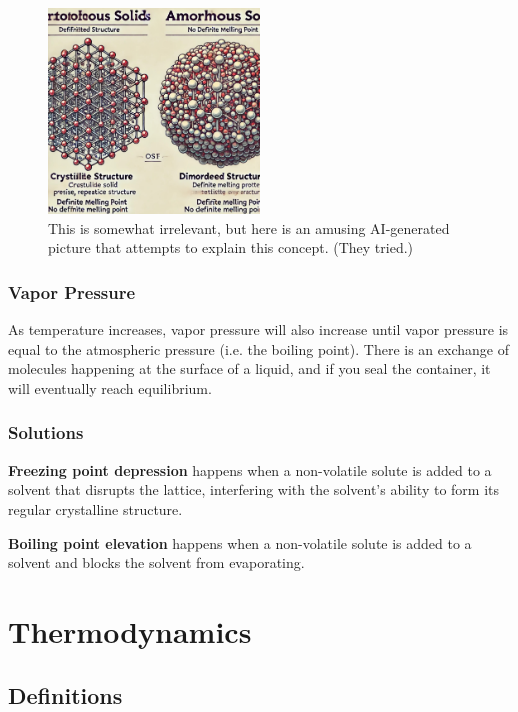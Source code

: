 \documentclass[a4paper, 12pt]{article}
\begin{document}
\begin{figure}[H]
\centering
\includegraphics[width=0.5\textwidth]{funnypic.jpg}
\caption*{This is somewhat irrelevant, but here is an amusing AI-generated picture that attempts to explain this concept. (They tried.)}
\end{figure}

\subsubsection*{Vapor Pressure}
As temperature increases, vapor pressure will also increase until vapor pressure is equal to the atmospheric pressure (i.e. the boiling point). There is an exchange of molecules happening at the surface of a liquid, and if you seal the container, it will eventually reach equilibrium.

\subsubsection*{Solutions}
\textbf{Freezing point depression} happens when a non-volatile solute is added to a solvent that disrupts the lattice, interfering with the solvent's ability to form its regular crystalline structure.

\textbf{Boiling point elevation} happens when a non-volatile solute is added to a solvent and blocks the solvent from evaporating.

\section{Thermodynamics}
\subsection*{Definitions}
\end{document}
